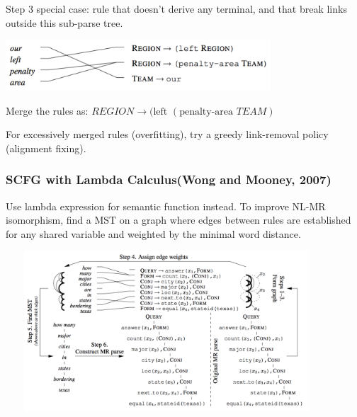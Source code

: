 \documentclass{beamer}
\begin{document}
\begin{frame}
     {
        Step 3 special case: rule that doesn't derive any terminal, and that break links
        outside this sub-parse tree.
        \begin{center}
            \includegraphics[width=9.86cm,height=1.9cm]{img/phrasal-coherence.png}
        \end{center}

        Merge the rules as: $REGION \to (\text{left } (\text{penalty-area } TEAM)$

        For excessively merged rules (overfitting), try a greedy link-removal policy
        (alignment fixing).
    }
\end{frame}

\begin{frame}
    \frametitle{SCFG with Lambda Calculus(Wong and Mooney, 2007)}
    Use lambda expression for semantic function instead. To improve NL-MR isomorphism,
    find a MST on a graph where edges between rules are established for any shared variable and 
    weighted by the minimal word distance.
    \begin{center}
        \includegraphics[width=12cm,height=6cm]{img/nl-ml-isomorphism.png}
    \end{center}
\end{frame}
\end{document}
